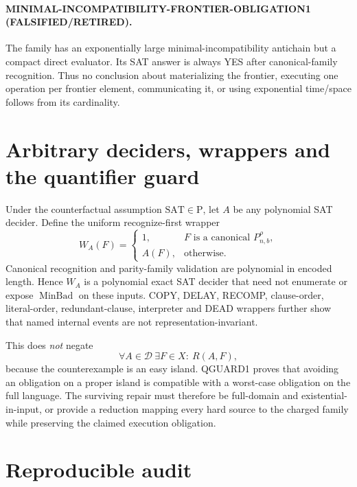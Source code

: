 \documentclass[11pt]{article}
\newcommand{\retired}{\textbf{FALSIFIED/RETIRED}}
\begin{document}
\paragraph{MINIMAL-INCOMPATIBILITY-FRONTIER-OBLIGATION1 (\retired).}
The family has an exponentially large minimal-incompatibility antichain but a
compact direct evaluator.  Its SAT answer is always YES after canonical-family
recognition.  Thus no conclusion about materializing the frontier, executing
one operation per frontier element, communicating it, or using exponential
time/space follows from its cardinality.

\section{Arbitrary deciders, wrappers and the quantifier guard}

Under the counterfactual assumption $\mathrm{SAT}\in\mathrm P$, let $A$ be any
polynomial SAT decider.  Define the uniform recognize-first wrapper
\[
W_A(F)=\begin{cases}
1,&F\text{ is a canonical }P_{n,b}^{\rho},\\
A(F),&\text{otherwise.}
\end{cases}
\]
Canonical recognition and parity-family validation are polynomial in encoded
length.  Hence $W_A$ is a polynomial exact SAT decider that need not enumerate
or expose $\operatorname{MinBad}$ on these inputs.  COPY, DELAY, RECOMP,
clause-order, literal-order, redundant-clause, interpreter and DEAD wrappers
further show that named internal events are not representation-invariant.

This does \emph{not} negate
\[
\forall A\in\mathcal D\ \exists F\in X:\ R(A,F),
\]
because the counterexample is an easy island.  QGUARD1 proves that avoiding an
obligation on a proper island is compatible with a worst-case obligation on
the full language.  The surviving repair must therefore be full-domain and
existential-in-input, or provide a reduction mapping every hard source to the
charged family while preserving the claimed execution obligation.

\section{Reproducible audit}
\end{document}
